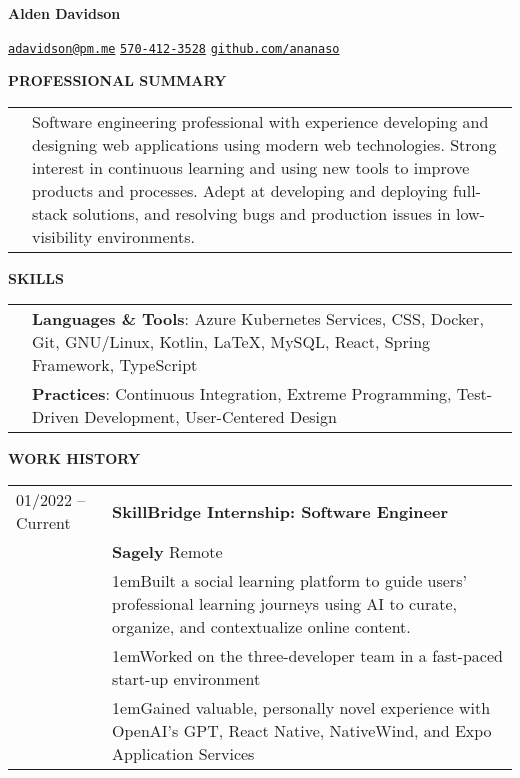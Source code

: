 \documentclass[11pt]{article}
\newlength{\dateColumnWidth}
\newcommand{\customBulletLabel}{\raisebox{0.4ex}{\tiny$\bullet$}}
\newcommand{\detail}{\par\noindent\makebox[1em][l]{\customBulletLabel}\hangindent1em}
\begin{document}
\begin{center}
    \begin{minipage}{0.70\textwidth}
        {\Huge\textbf{Alden Davidson}}
    \end{minipage}%
    \begin{minipage}{0.30\textwidth}
        \raggedleft
        \href{mailto:adavidson@pm.me}{\nolinkurl{adavidson@pm.me}}
        \href{tel:5704123528}{\nolinkurl{570-412-3528}}
        \href{https://github.com/ananaso}{\nolinkurl{github.com/ananaso}}
    \end{minipage}
\end{center}
{\Large \textbf{PROFESSIONAL SUMMARY}}
\bigbreak
\begin{tabularx}{\textwidth}{@{}p{\dateColumnWidth}X@{}}
     & Software engineering professional with experience developing and designing web applications using modern web technologies.
    Strong interest in continuous learning and using new tools to improve products and processes.
    Adept at developing and deploying full-stack solutions, and resolving bugs and production issues in low-visibility environments.
\end{tabularx}
\bigbreak
{\Large \textbf{SKILLS}}
\bigbreak
\begin{tabularx}{\textwidth}{@{}p{\dateColumnWidth}X@{}}
     & \textbf{Languages \& Tools}: Azure Kubernetes Services, CSS, Docker, Git, GNU/Linux, Kotlin, \LaTeX, MySQL, React, Spring Framework, TypeScript \\
     & \textbf{Practices}: Continuous Integration, Extreme Programming, Test-Driven Development, User-Centered Design                                  \\
\end{tabularx}
\bigbreak
{\Large \textbf{WORK HISTORY}}
\bigbreak
\begin{tabularx}{\textwidth}{@{}p{\dateColumnWidth}X@{}}
    01/2022 -- Current & \textbf{SkillBridge Internship: Software Engineer}                                                                                                      \\
                       & \textbf{Sagely} \textbar{} Remote                                                                                                                       \\
                       & \detail Built a social learning platform to guide users' professional learning journeys using AI to curate, organize, and contextualize online content. \\
                       & \detail Worked on the three-developer team in a fast-paced start-up environment                                                                         \\
                       & \detail Gained valuable, personally novel experience with OpenAI's GPT, React Native, NativeWind, and Expo Application Services
\end{tabularx}
\end{document}
